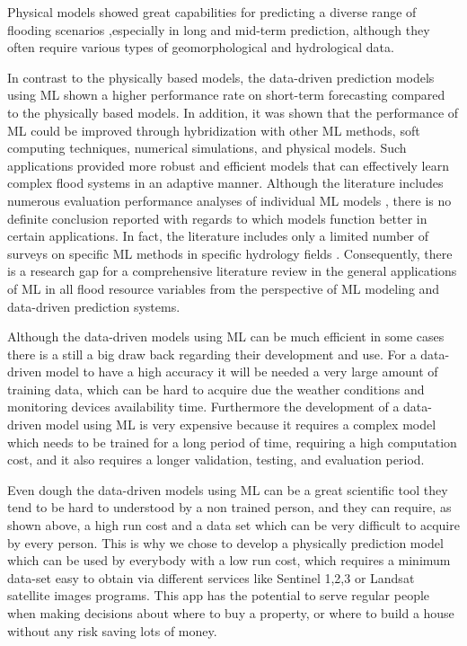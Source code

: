 \documentclass[12pt, a4paper]{report}
\begin{document}
Physical models showed great capabilities for predicting a diverse range of flooding scenarios \cite{Nayak},especially in long and mid-term prediction, although they often require various types of geomorphological and  hydrological data. 
\par 

In contrast to the physically based models, the data-driven prediction models using ML shown a higher performance rate on  short-term forecasting compared to the physically based models. In addition,  it was shown that the performance of ML could be improved through hybridization  with other ML methods, soft computing techniques, numerical simulations, and physical models. Such applications provided more robust and efficient models that can effectively learn complex flood systems in an adaptive manner. Although the literature includes numerous evaluation performance analyses of individual ML models \cite{Taherei, Kasiviswanathan, Ravansalar, Mosavi}, there is no definite conclusion reported with regards to which models function better in certain applications. In fact, the literature includes only a limited number of surveys on specific ML methods in specific hydrology fields \cite{Dandagala, Deka, Fotovatikhah}. Consequently, there is a research gap for a comprehensive literature review in the general applications of ML in all flood resource variables from the perspective of ML modeling and data-driven prediction systems.
\par 

Although the data-driven models using ML can be much efficient in some cases there is a still a big draw back regarding their development and use. For a data-driven model to have a high accuracy it will be needed a very large amount of training data, which can be hard to acquire due the weather conditions and monitoring devices availability time. Furthermore the development of a data-driven model using ML is very expensive because it requires a complex model which needs to be trained for a long period of time, requiring a high computation cost, and it also requires a longer validation, testing, and evaluation period.
\par

Even dough the data-driven models using ML can be a great scientific tool they tend to be hard to understood by a non trained person, and they can require, as shown above, a high run cost and a data set which can be very difficult to acquire by every person. This is why we chose to develop a physically prediction model which can be used by everybody with a low run cost, which requires a minimum data-set easy to obtain via different services like Sentinel 1,2,3 or Landsat satellite images programs. This app has the potential to serve regular people when making decisions about where to buy a property, or where to build a house without any risk saving lots of money.
\par
\end{document}
